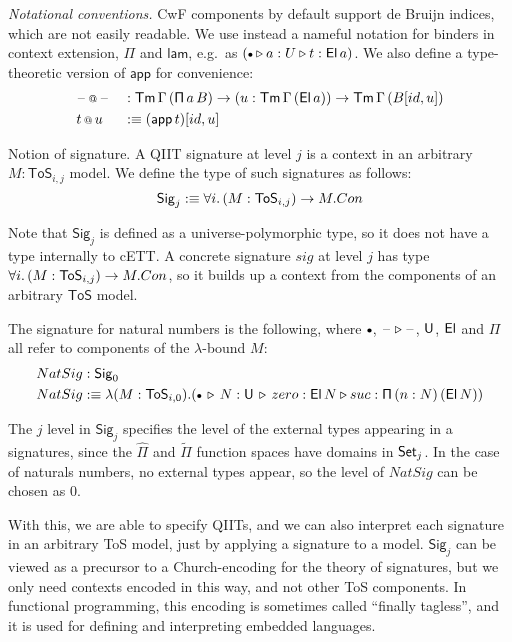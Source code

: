 \documentclass{llncs}
\makeatletter
\newcommand{\ToS}{\mathsf{ToS}}
\newcommand{\ext}{\triangleright}
\newcommand{\emptycon}{\scaleobj{.75}\bullet}
\newcommand{\Pii}{\mathsf{\Pi}}
\newcommand{\appi}{\mathsf{app}}
\newcommand{\lami}{\mathsf{lam}}
\newcommand{\Pie}{\mathsf{\hat{\Pi}}}
\newcommand{\Piinf}{\mathsf{\tilde{\Pi}}}
\newcommand{\appitt}{\mathop{{\scriptstyle @}}}
\newcommand{\Sig}{\mathsf{Sig}}
\makeatother
\begin{document}
\emph{Notational conventions.} CwF components by default support de Bruijn
indices, which are not easily readable. We use instead a nameful notation for
binders in context extension, $\Pii$ and $\lami$, e.g.\ as $(\emptycon \ext a :
U \ext t : \El\,a)$. We also define a type-theoretic version of $\appi$ for
convenience:
\begin{alignat*}{3}
  & \blank\appitt\blank && :
      \Tm\,\Gamma\,(\Pii\,a\,B)\ra
      (u : \Tm\,\Gamma\,(\El\,a)) \ra \Tm\,\Gamma\,(B[id, u])\\
  & t\appitt u && :\equiv (\appi\,t)[id, u]
\end{alignat*}

\begin{nidefinition}{Notion of signature.}
A QIIT signature at level $j$ is a context in an arbitrary $M : \ToS_{i,j}$
model. We define the type of such signatures as follows:
\[
  \Sig_j :\equiv \forall i.\,(M : \ToS_{i,j})\ra M.Con
\]

Note that $\Sig_j$ is defined as a universe-polymorphic type, so it does not
have a type internally to cETT. A concrete signature $sig$ at level $j$ has type
$\forall i.\,(M : \ToS_{i,j})\ra M.Con$, so it builds up a context from the
components of an arbitrary $\ToS$ model.

\begin{example}
The signature for natural
numbers is the following, where $\emptycon$, $\blank\ext\blank$, $\mathsf{U}$, $\mathsf{El}$ and
$\Pii$ all refer to components of the $\lambda$-bound $M$:
\begin{alignat*}{3}
  & NatSig : \Sig_0 \\
  & NatSig :\equiv \lambda (M : \ToS_{i,0}). (\emptycon\,\ext\, N : \U \,\ext\, zero : \El\,N \ext suc : \Pii\,(n : N)\,(\El\,N))
\end{alignat*}
\end{example}

The $j$ level in $\Sig_j$ specifies the level of the external types appearing in
a signatures, since the $\Pie$ and $\Piinf$ function spaces have domains in $\mathsf{Set}_j$.
In the case of naturals numbers, no external types appear, so the level of $NatSig$
can be chosen as $0$.

With this, we are able to specify QIITs, and we can also interpret each
signature in an arbitrary ToS model, just by applying a signature to a model.
$\Sig_j$ can be viewed as a precursor to a Church-encoding for the theory of
signatures, but we only need contexts encoded in this way, and not other ToS
components. In functional programming, this encoding is sometimes called
``finally tagless''\cite{TODO}, and it is used for defining and interpreting
embedded languages.
\end{nidefinition}
\end{document}
